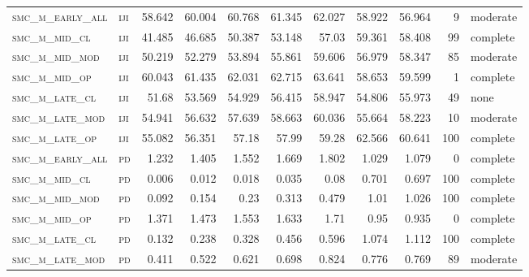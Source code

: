 \begin{landscape}
\begin{center}
\begin{footnotesize}
\begin{longtable}{llrrrrr|rrr}
\textsc{smc\_m\_early\_all} & \textsc{iji       }   & 58.642   & 60.004   & 60.768   & 61.345   & 62.027   & 58.922      & 56.964        & 9             & moderate \\
\textsc{smc\_m\_mid\_cl   } & \textsc{iji       }   & 41.485   & 46.685   & 50.387   & 53.148   & 57.03    & 59.361      & 58.408        & 99            & complete \\
\textsc{smc\_m\_mid\_mod  } & \textsc{iji       }   & 50.219   & 52.279   & 53.894   & 55.861   & 59.606   & 56.979      & 58.347        & 85            & moderate \\
\textsc{smc\_m\_mid\_op   } & \textsc{iji       }   & 60.043   & 61.435   & 62.031   & 62.715   & 63.641   & 58.653      & 59.599        & 1             & complete \\
\textsc{smc\_m\_late\_cl  } & \textsc{iji       }   & 51.68    & 53.569   & 54.929   & 56.415   & 58.947   & 54.806      & 55.973        & 49            & none \\
\textsc{smc\_m\_late\_mod } & \textsc{iji       }   & 54.941   & 56.632   & 57.639   & 58.663   & 60.036   & 55.664      & 58.223        & 10            & moderate \\
\textsc{smc\_m\_late\_op  } & \textsc{iji       }   & 55.082   & 56.351   & 57.18    & 57.99    & 59.28    & 62.566      & 60.641        & 100           & complete \\
\textsc{smc\_m\_early\_all} & \textsc{pd        }   & 1.232    & 1.405    & 1.552    & 1.669    & 1.802    & 1.029       & 1.079         & 0             & complete     \\
\textsc{smc\_m\_mid\_cl   } & \textsc{pd        }   & 0.006    & 0.012    & 0.018    & 0.035    & 0.08     & 0.701       & 0.697         & 100           & complete \\
\textsc{smc\_m\_mid\_mod  } & \textsc{pd        }   & 0.092    & 0.154    & 0.23     & 0.313    & 0.479    & 1.01        & 1.026         & 100           & complete \\
\textsc{smc\_m\_mid\_op   } & \textsc{pd        }   & 1.371    & 1.473    & 1.553    & 1.633    & 1.71     & 0.95        & 0.935         & 0             & complete     \\
\textsc{smc\_m\_late\_cl  } & \textsc{pd        }   & 0.132    & 0.238    & 0.328    & 0.456    & 0.596    & 1.074       & 1.112         & 100           & complete \\
\textsc{smc\_m\_late\_mod } & \textsc{pd        }   & 0.411    & 0.522    & 0.621    & 0.698    & 0.824    & 0.776       & 0.769         & 89            & moderate \\

\end{longtable}
\end{footnotesize}
\end{center}
\end{landscape}

